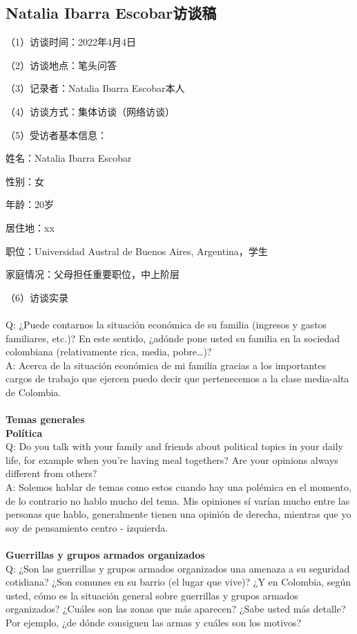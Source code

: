 \documentclass{phyasgn}\usepackage{nag}
\begin{document}
\subsection{Natalia Ibarra Escobar访谈稿}
\par （1）访谈时间：2022年4月4日
\par （2）访谈地点：笔头问答
\par （3）记录者：Natalia Ibarra Escobar本人
\par （4）访谈方式：集体访谈（网络访谈）
\par （5）受访者基本信息：
  \par 姓名：Natalia Ibarra Escobar
\par 性别：女
\par 年龄：20岁
\par 居住地：xx
\par 职位：Universidad Austral de Buenos Aires, Argentina，学生
\par 家庭情况：父母担任重要职位，中上阶层
\par （6）访谈实录\\
\\
Q: ¿Puede contarnos la situación económica de su familia (ingresos y gastos familiares, etc.)? En este sentido, ¿adónde pone usted su familia en la sociedad colombiana (relativamente rica, media, pobre…)?\\
A: Acerca de la situación económica de mi familia gracias a los importantes cargos de trabajo que ejercen puedo decir que pertenecemos a la clase media-alta de Colombia.\\
\\
\textbf{Temas generales}\\
\textbf{Política}\\
Q: Do you talk with your family and friends about political topics in your daily life, for example when you’re having meal togethers? Are your opinions always different from others?\\
A: Solemos hablar de temas como estos cuando hay una polémica en el momento, de lo contrario no hablo mucho del tema. Mis opiniones sí varían mucho entre las personas que hablo, generalmente tienen una opinión de derecha, mientras que yo soy de pensamiento centro - izquierda.\\
\\
\textbf{Guerrillas y grupos armados organizados}\\ 
Q: ¿Son las guerrillas y grupos armados organizados una amenaza a su seguridad cotidiana? ¿Son comunes en su barrio (el lugar que vive)? ¿Y en Colombia, según usted, cómo es la situación general sobre guerrillas y grupos armados organizados? ¿Cuáles son las zonas que más aparecen? ¿Sabe usted más detalle? Por ejemplo, ¿de dónde consiguen las armas y cuáles son los motivos? \\
\end{document}
